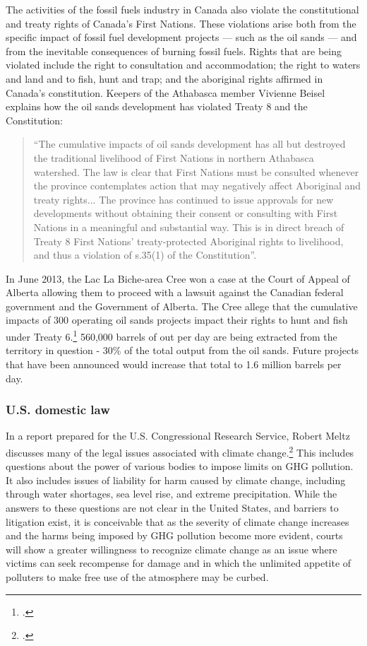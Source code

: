 The activities of the fossil fuels industry in Canada also violate the constitutional and treaty rights of Canada's First Nations.
These violations arise both from the specific impact of fossil fuel development projects --- such as the oil sands --- and from the inevitable consequences of burning fossil fuels.
Rights that are being violated include the right to consultation and accommodation; the right to waters and land and to fish, hunt and trap; and the aboriginal rights affirmed in Canada's constitution.
Keepers of the Athabasca member Vivienne Beisel explains how the oil sands development has violated Treaty 8 and the Constitution:
\begin{quote}
``The cumulative impacts of oil sands development has all but destroyed the traditional livelihood of First Nations in northern Athabasca watershed.  The law is clear that First Nations must be consulted whenever the province contemplates action that may negatively affect Aboriginal and treaty rights... The province has continued to issue approvals for new developments without obtaining their consent or consulting with First Nations in a meaningful and substantial way. This is in direct breach of Treaty 8 First Nations' treaty-protected Aboriginal rights to livelihood, and thus a violation of s.35(1) of the Constitution''.
\end{quote}
In June 2013, the Lac La Biche-area Cree won a case at the Court of Appeal of Alberta allowing them to proceed with a lawsuit against the Canadian federal government and the Government of Alberta.
The Cree allege that the cumulative impacts of 300 operating oil sands projects impact their rights to hunt and fish under Treaty 6.\footcite[][]{BandWinsTreatyRights}
560,000 barrels of out per day are being extracted from the territory in question - 30\% of the total output from the oil sands.
Future projects that have been announced would increase that total to 1.6 million barrels per day.



		\subsubsection{U.S. domestic law}



In a report prepared for the U.S. Congressional Research Service, Robert Meltz discusses many of the legal issues associated with climate change.\footcite[][]{ExistingLaw}
This includes questions about the power of various bodies to impose limits on GHG pollution.
It also includes issues of liability for harm caused by climate change, including through water shortages, sea level rise, and extreme precipitation.
While the answers to these questions are not clear in the United States, and barriers to litigation exist, it is conceivable that as the severity of climate change increases and the harms being imposed by GHG pollution become more evident, courts will show a greater willingness to recognize climate change as an issue where victims can seek recompense for damage and in which the unlimited appetite of polluters to make free use of the atmosphere may be curbed.


